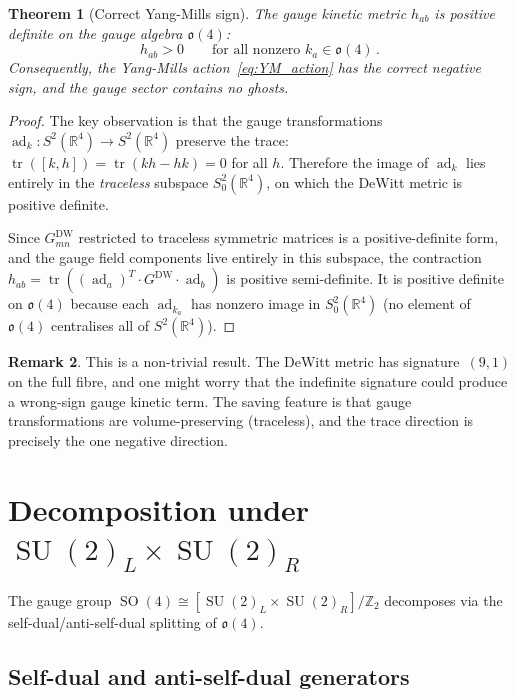 \documentclass[12pt,a4paper]{article}
\newtheorem{theorem}{Theorem}[section]
\theoremstyle{definition}
\newtheorem{remark}[theorem]{Remark}
\newcommand{\tr}{\operatorname{tr}}
\newcommand{\SO}{\operatorname{SO}}
\newcommand{\SU}{\operatorname{SU}}
\newcommand{\ad}{\operatorname{ad}}
\newcommand{\R}{\mathbb{R}}
\newcommand{\Z}{\mathbb{Z}}
\begin{document}
\begin{theorem}[Correct Yang-Mills sign]
\label{thm:YM_sign}
The gauge kinetic metric $h_{ab}$ is positive definite on the gauge algebra $\mathfrak{o}(4)$:
\begin{equation}
h_{ab} > 0\qquad \text{for all nonzero } k_a \in \mathfrak{o}(4)\,.
\end{equation}
Consequently, the Yang-Mills action~\eqref{eq:YM_action} has the correct negative sign, and the gauge sector contains no ghosts.
\end{theorem}

\begin{proof}
The key observation is that the gauge transformations $\ad_k\colon S^2(\R^4) \to S^2(\R^4)$ preserve the trace: $\tr([k,h]) = \tr(kh - hk) = 0$ for all $h$.
Therefore the image of $\ad_k$ lies entirely in the \emph{traceless} subspace $S^2_0(\R^4)$, on which the DeWitt metric is positive definite.

Since $G^{\mathrm{DW}}_{mn}$ restricted to traceless symmetric matrices is a positive-definite form, and the gauge field components live entirely in this subspace, the contraction $h_{ab} = \tr((\ad_a)^T\! \cdot G^{\mathrm{DW}} \cdot \ad_b)$ is positive semi-definite.
It is positive definite on $\mathfrak{o}(4)$ because each $\ad_{k_a}$ has nonzero image in $S^2_0(\R^4)$ (no element of $\mathfrak{o}(4)$ centralises all of $S^2(\R^4)$).
\end{proof}

\begin{remark}
This is a non-trivial result.
The DeWitt metric has signature~$(9,1)$ on the full fibre, and one might worry that the indefinite signature could produce a wrong-sign gauge kinetic term.
The saving feature is that gauge transformations are volume-preserving (traceless), and the trace direction is precisely the one negative direction.
\end{remark}


\section{Decomposition under $\SU(2)_L \times \SU(2)_R$}
\label{sec:su2_decomp}

The gauge group $\SO(4) \cong [\SU(2)_L \times \SU(2)_R]/\Z_2$ decomposes via the self-dual/anti-self-dual splitting of $\mathfrak{o}(4)$.

\subsection{Self-dual and anti-self-dual generators}
\end{document}
